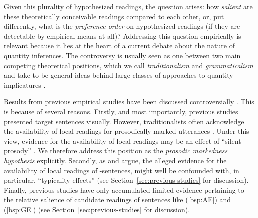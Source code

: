 \documentclass[fleqn,reqno,10pt]{article}
\newcommand{\as}{\acro{as}}
\begin{document}
Given this plurality of hypothesized readings, the question arises:
how \emph{salient} are these theoretically conceivable readings compared to
each other, or, put differently, what is the \emph{preference order} on
hypothesized readings (if they are detectable by empirical means at all)?
Addressing this question empirically is relevant because it lies at
the heart of a current debate about the nature of quantity inferences.
The controversy is usually seen as one between two main competing
theoretical positions, which we call \emph{traditionalism} and
\emph{grammaticalism} and take to be general ideas behind large
classes of approaches to quantity implicatures \citep[c.f.][for related
discussion with a focus on deriving processing
theories]{ChemlaSingh2014:Remarks-on-the-}. %

Results from previous empirical studies have been discussed
controversially
\citep[e.g.][]{GeurtsPouscoulous2009:Embedded-Implic,CliftonDube2010:Embedded-Implic,ChemlaSpector2010:Experimental-Ev,BenzGotzner2014:Embedded-implic}. This
is because of several reasons. Firstly, and most importantly, previous
studies presented target sentences visually.  However, traditionalists
often acknowledge the availability of local readings for prosodically
marked utterances
\citep[e.g.][]{Horn2006:The-Border-Wars,Geurts2009:Scalar-Implicat,ChemlaSpector2010:Experimental-Ev,Geurts2010:Quantity-Implic,Tielvan-Tiel2012:Embedded-Scalar,GeurtsTielvan-Tiel2013:Embedded-Scalar}. Under
this view, evidence for the availability of local readings
\citep[see][]{CliftonDube2010:Embedded-Implic,ChemlaSpector2010:Experimental-Ev}
may be an effect of “silent prosody” \citep[see
e.g.][]{Bader98,Fodor98}. We therefore address this position as the
\emph{prosodic markedness hypothesis} explicitly. Secondly, as
\citet{Tielvan-Tiel2012:Embedded-Scalar} and
\citet{GeurtsTielvan-Tiel2013:Embedded-Scalar} argue, the alleged
evidence for the availability of local readings of \as-sentences,
might well be confounded with, in particular, “typicality effects”
(see Section~\ref{sec:previous-studies} for discussion).  Finally,
previous studies have only accumulated limited evidence pertaining to
the relative salience of candidate readings of sentences like
(\ref{bsp:AE}) and (\ref{bsp:GE}) (see
Section~\ref{sec:previous-studies} for discussion).
\end{document}
